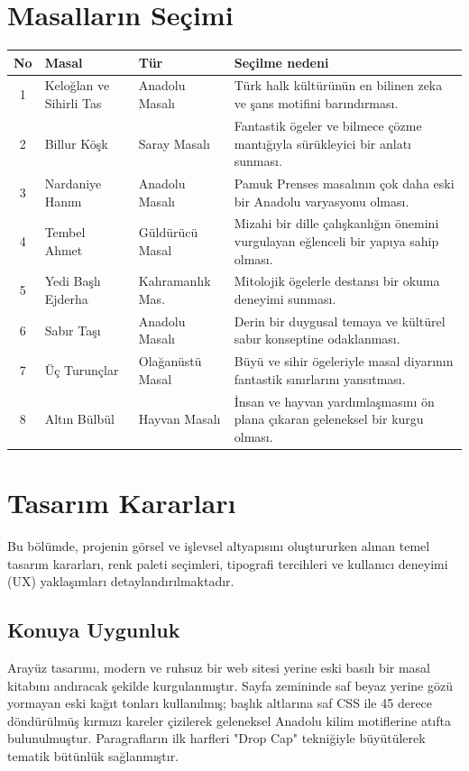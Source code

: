 \documentclass[12pt,a4paper]{article}
\begin{document}
\section{Masalların Seçimi}
\begin{longtable}{@{}cp{4cm}p{3cm}p{5.4cm}@{}}
\toprule
\textbf{No} & \textbf{Masal} & \textbf{Tür} & \textbf{Seçilme nedeni} \\
\midrule
\endhead
1 & Keloğlan ve Sihirli Tas & Anadolu Masalı & Türk halk kültürünün en bilinen zeka ve şans motifini barındırması. \\
2 & Billur Köşk & Saray Masalı & Fantastik ögeler ve bilmece çözme mantığıyla sürükleyici bir anlatı sunması. \\
3 & Nardaniye Hanım & Anadolu Masalı & Pamuk Prenses masalının çok daha eski bir Anadolu varyasyonu olması. \\
4 & Tembel Ahmet & Güldürücü Masal & Mizahi bir dille çalışkanlığın önemini vurgulayan eğlenceli bir yapıya sahip olması. \\
5 & Yedi Başlı Ejderha & Kahramanlık Mas. & Mitolojik ögelerle destansı bir okuma deneyimi sunması. \\
6 & Sabır Taşı & Anadolu Masalı & Derin bir duygusal temaya ve kültürel sabır konseptine odaklanması. \\
7 & Üç Turunçlar & Olağanüstü Masal & Büyü ve sihir ögeleriyle masal diyarının fantastik sınırlarını yansıtması. \\
8 & Altın Bülbül & Hayvan Masalı & İnsan ve hayvan yardımlaşmasını ön plana çıkaran geleneksel bir kurgu olması. \\
\bottomrule
\end{longtable}

\section{Tasarım Kararları}
Bu bölümde, projenin görsel ve işlevsel altyapısını oluştururken alınan temel tasarım kararları, renk paleti seçimleri, tipografi tercihleri ve kullanıcı deneyimi (UX) yaklaşımları detaylandırılmaktadır.


\subsection{Konuya Uygunluk}
Arayüz tasarımı, modern ve ruhsuz bir web sitesi yerine eski basılı bir masal kitabını andıracak şekilde kurgulanmıştır. Sayfa zemininde saf beyaz yerine gözü yormayan eski kağıt tonları kullanılmış; başlık altlarına saf CSS ile 45 derece döndürülmüş kırmızı kareler çizilerek geleneksel Anadolu kilim motiflerine atıfta bulunulmuştur. Paragrafların ilk harfleri "Drop Cap" tekniğiyle büyütülerek tematik bütünlük sağlanmıştır.
\end{document}
